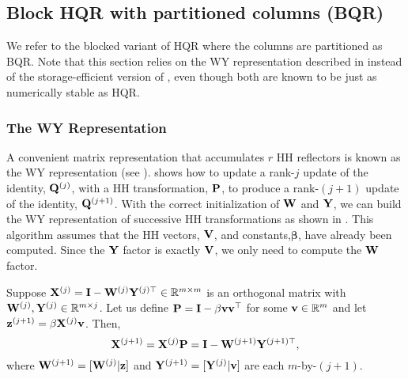\subsection{Block HQR with partitioned columns (BQR)}\label{sec:BQR}
We refer to the blocked variant of HQR where the columns are partitioned as BQR. 
Note that this section relies on the WY representation described in \cite{Bischof1987} instead of the storage-efficient version of \cite{Schreiber1989}, even though both are known to be just as numerically stable as HQR.
\subsubsection{The WY Representation}
A convenient matrix representation that accumulates $r$ HH reflectors is known as the WY representation (see \cite{Bischof1987,golub2013matrix}).
 shows how to update a rank-$j$ update of the identity, $\mathbf{Q}^{(j)}$, with a HH transformation, $\mathbf{P}$, to produce a rank-$(j+1)$ update of the identity, $\mathbf{Q}^{(j+1)}$. 
With the correct initialization of $\mathbf{W}$ and $\mathbf{Y}$, we can build the WY representation of successive HH transformations as shown in . 
This algorithm assumes that the HH vectors, $\mathbf{V}$, and constants,$\bm{\beta}$, have already been computed.
Since the $\mathbf{Y}$ factor is exactly $\mathbf{V}$, we only need to compute the $\mathbf{W}$ factor.
\begin{lemma}\label{lem:WY}
	Suppose $\mathbf{X}^{(j)}=\mathbf{I}-\mathbf{W}^{(j)}\mathbf{Y}^{(j)\top}\in\mathbb{R}^{m\times m}$ is an orthogonal matrix with $\mathbf{W}^{(j)},\mathbf{Y}^{(j)}\in\mathbb{R}^{m\times j}$.
	Let us define $\mathbf{P}=\mathbf{I}-\beta\mathbf{vv}^{\top}$ for some $\mathbf{v}\in\mathbb{R}^m$ and let $\mathbf{z}^{(j+1)}=\beta\mathbf{X}^{(j)}\mathbf{v}$.
	Then, \[\mathbf{X}^{(j+1)} = \mathbf{X}^{(j)}\mathbf{P} = \mathbf{I} - \mathbf{W}^{(j+1)}\mathbf{Y}^{(j+1)\top}, \]where $ \mathbf{W}^{(j+1)} =[\mathbf{W}^{(j)}|\mathbf{z}]$ and $ \mathbf{Y}^{(j+1)}=[\mathbf{Y}^{(j)}|\mathbf{v}]$ are each $m$-by-$(j+1)$. 
\end{lemma}
%

